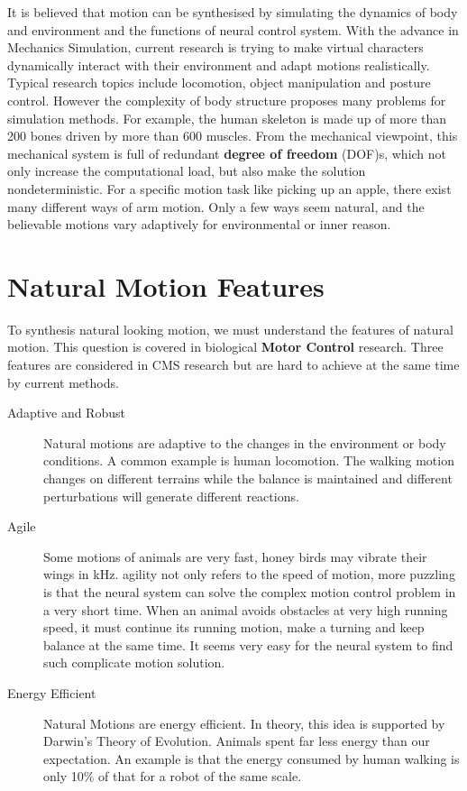 It is believed that motion can be synthesised by simulating the dynamics of body and environment and the functions of neural control system.  
With the advance in Mechanics Simulation, current research is trying to make virtual characters dynamically interact with their environment and adapt motions realistically.
Typical research topics include locomotion, object manipulation and posture control.
However the complexity of body structure proposes many problems for simulation methods.
For example, the human skeleton is made up of more than 200 bones driven by more than 600 muscles.
From the mechanical viewpoint,  
this mechanical system is full of redundant \textbf{degree of freedom} (DOF)s,  which not only increase the computational load, but also make the solution nondeterministic. 
For a specific motion task like picking up an apple, there exist many different ways of arm motion. 
Only a few ways seem natural, and the believable motions vary adaptively for environmental or inner reason.

 

\section{Natural Motion Features}
To synthesis natural looking motion, we must understand the features of natural motion.
This question is covered in biological \textbf{Motor Control} research.
Three features are considered in CMS research but are hard to achieve at the same time by current methods. 
\begin{description}
\item [Adaptive and Robust]
Natural motions are adaptive to the changes in the environment or body conditions. 
A common example is human locomotion. 
The walking motion changes on different terrains while the balance is maintained and different perturbations will generate different reactions.  

\item [Agile]
Some motions of animals are very fast, honey birds may vibrate their wings in kHz.
agility not only refers to the speed of motion,
more puzzling is that the neural system can solve the complex motion control problem in a very short time. 
When an animal avoids obstacles at very high running speed, 
it must continue its running motion, make a turning and keep balance at the same time. 
It seems very easy for the neural system to find such complicate motion solution.

\item  [Energy Efficient]
Natural Motions are energy efficient.
In theory, this idea is supported by Darwin's Theory of Evolution.
Animals spent far less energy than our expectation.
An example is that the energy consumed by human walking is only 10\% of that for a robot of the same scale.
\end{description}

